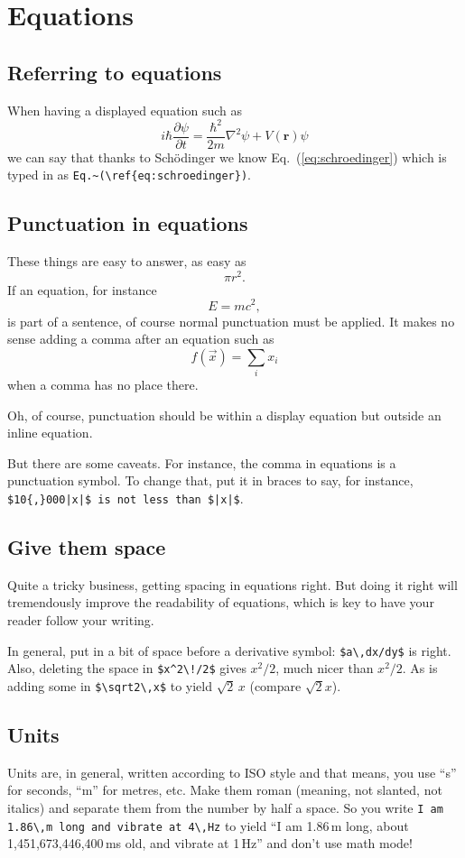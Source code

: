 \documentclass{article}
\begin{document}
\section{Equations}
\subsection{Referring to equations}\label{sec:refereq}
When having a displayed equation such as
\begin{equation}\label{eq:schroedinger}
i\hbar\frac{\partial\psi}{\partial t} = \frac{\hbar^2}{2m}\nabla^2\psi + V(\mathbf{r})\psi
\end{equation}
we can say that thanks to Sch\"odinger we know Eq.~(\ref{eq:schroedinger}) which
is typed in as \verb+Eq.~(\ref{eq:schroedinger})+.

\subsection{Punctuation in equations}

These things are easy to answer, as easy as
$$ \pi r^2.$$
If an equation, for instance
$$ E = m c^2, $$
is part of a sentence, of course normal punctuation must be applied.  It makes no sense adding a comma after an equation such as 
$$ f(\vec x) = \sum_i x_i $$
when a comma has no place there.

Oh, of course, punctuation should be within a display equation but outside an inline equation.

But there are some caveats.  For instance, the comma in equations is a punctuation symbol.
To change that, put it in braces to say, for instance, \verb+$10{,}000|x|$ is not less than $|x|$+.

\subsection{Give them space}
Quite a tricky business, getting spacing in equations right.  But doing it right will tremendously
improve the readability of equations, which is key to have your reader follow your writing.

In general, put in a bit of space before a derivative symbol: \verb+$a\,dx/dy$+ is right.
Also, deleting the space in \verb+$x^2\!/2$+ gives $x^2\!/2$, much nicer than $x^2/2$.
As is adding some in \verb+$\sqrt2\,x$+ to yield $\sqrt2\,x$ (compare $\sqrt2x$).

\subsection{Units}
Units are, in general, written according to ISO style and that means, you use ``s'' for seconds, ``m'' for metres, etc.  Make them roman (meaning, not slanted, not italics) and separate them from the number by half a space.  So you write \verb+I am 1.86\,m long and vibrate at 4\,Hz+ to yield ``I am 1.86\,m long, about 1,451,673,446,400\,ms old, and vibrate at 1\,Hz'' and don't use math mode!  
\end{document}
